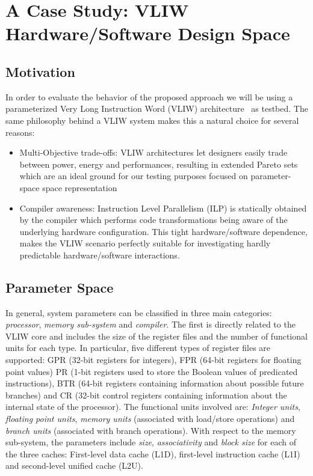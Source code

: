\section{A Case Study: VLIW Hardware/Software Design Space}
\label{sec:ee}
\subsection{Motivation}
In order to evaluate the behavior of the proposed approach
we will be using a parameterized Very Long Instruction
Word (VLIW) architecture~\cite{kathail_tr00} as testbed. The same philosophy
behind a VLIW system makes this a natural choice for several reasons:
\begin{itemize}
\item{Multi-Objective trade-offs}: VLIW architectures let designers
easily trade between power, energy and performances, resulting
in extended Pareto sets which are an ideal ground for our testing
purposes focused on parameter-space space representation
\item{Compiler awareness}: Instruction Level Parallelism (ILP)
is statically obtained by the compiler which
performs code transformations being aware of the underlying hardware
configuration.  This tight hardware/software dependence, makes the
VLIW scenario perfectly suitable for investigating hardly predictable
hardware/software interactions.
\end{itemize}

\subsection{Parameter Space}
In general, system parameters can be classified in three main categories:
\emph{processor}, \emph{memory sub-system} and \emph{compiler}. 
The first is directly related to the VLIW core and includes the size
of the register files and the number of functional
units for each type. In particular, five different types of register
files are supported:
GPR (32-bit registers for integers), FPR (64-bit registers for
floating point values) PR (1-bit registers used to store the Boolean
values of predicated instructions), BTR (64-bit registers containing
information about possible future branches) and CR (32-bit control
registers containing information about the internal state of the
processor). The functional units involved are: \emph{Integer units},
\emph{floating point units}, \emph{memory units} (associated with
load/store operations) and \emph{branch units} (associated with branch
operations). With respect to the memory sub-system, the parameters
include \emph{size}, \emph{associativity} and
\emph{block size} for each of the three caches: First-level data cache
(L1D), first-level instruction cache (L1I) and second-level unified
cache (L2U).


